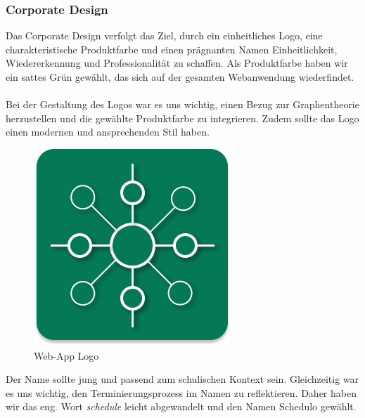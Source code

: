 \subsubsection{Corporate Design}
Das Corporate Design verfolgt das Ziel, durch ein einheitliches Logo, eine charakteristische Produktfarbe und einen prägnanten Namen Einheitlichkeit, Wiedererkennung und Professionalität zu schaffen. Als Produktfarbe haben wir ein sattes Grün gewählt, das sich auf der gesamten Webanwendung wiederfindet.\\\\
Bei der Gestaltung des Logos war es uns wichtig, einen Bezug zur Graphentheorie herzustellen und die gewählte Produktfarbe zu integrieren. Zudem sollte das Logo einen modernen und ansprechenden Stil haben.
\begin{figure}[H]
    \centering
    \includegraphics[width=0.2\linewidth]{docs/graphics/favicon.png}
    \caption{Web-App Logo}
    \label{fig:logo}
\end{figure}
\noindent Der Name sollte jung und passend zum schulischen Kontext sein. Gleichzeitig war es uns wichtig, den Terminierungsprozess im Namen zu reflektieren. Daher haben wir das eng. Wort \textit{schedule} leicht abgewandelt und den Namen \glqq Schedulo\grqq{} gewählt.\\\\